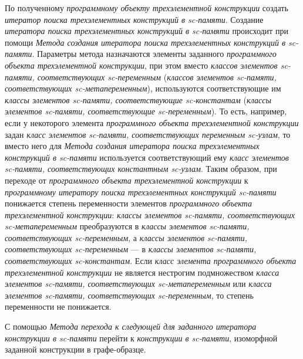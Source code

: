 \begin{SCn}
\begin{scnsubstruct}
\begin{scnsubstruct}
\begin{scnsubstruct}
\begin{scnsubstruct}
\begin{scnsubstruct}
\begin{scnsubstruct}
\begin{scnsubstruct}
\begin{scnsubstruct}
{\begin{scnitemize}
				\item По полученному \textit{программному объекту трехэлементной конструкции} создать \textit{итератор поиска трехэлементных конструкций в sc-памяти}. Создание \textit{итератора поиска трехэлементных конструкций в sc-памяти} происходит при помощи \textit{Метода создания итератора поиска трехэлементных конструкций в sc-памяти}. Параметры метода назначаются элементы заданного \textit{программного объекта трехэлементной конструкции}, при этом вместо \textit{классов элементов sc-памяти, соответствующих sc-переменным} (\textit{классов элементов sc-памяти, соответствующих sc-метапеременным}), используются соответствующие им \textit{классы элементов sc-памяти, соответствующие sc-константам} (\textit{классы элементов sc-памяти, соответствующие sc-переменным}). То есть, например, если у некоторого элемента \textit{программного объекта трехэлементной конструкции} задан \textit{класс элементов sc-памяти, соответствующих переменным sc-узлам}, то вместо него для \textit{Метода создания итератора поиска трехэлементных конструкций в sc-памяти} используется соответствующий ему \textit{класс элементов sc-памяти, соответствующих константным sc-узлам}. Таким образом, при переходе от \textit{программного объекта трехэлементной конструкции} к \textit{программному итератору поиска трехэлементных конструкций sc-памяти} понижается степень переменности элементов \textit{программного объекта трехэлементной конструкции}: \textit{классы элементов sc-памяти, соответствующих sc-метапеременным} преобразуются в \textit{классы элементов sc-памяти, соответствующих sc-переменным}, а \textit{классы элементов sc-памяти, соответствующих sc-переменным} --- в \textit{классы элементов sc-памяти, соответствующих sc-константам}. Если \textit{класс элемента программного объекта трехэлементной конструкции} не является нестрогим подмножеством \textit{класса элементов sc-памяти, соответствующих sc-метапеременным} или \textit{класса элементов sc-памяти, соответствующих sc-переменным}, то степень переменности не понижается.
				\item С помощью \textit{Метода перехода к следующей  для заданного итератора конструкции в sc-памяти} перейти к \textit{конструкции в sc-памяти}, изоморфной заданной конструкции в графе-образце.
			\end{scnitemize}
			
}
\end{scnsubstruct}
\end{scnsubstruct}
\end{scnsubstruct}
\end{scnsubstruct}
\end{scnsubstruct}
\end{scnsubstruct}
\end{scnsubstruct}
\end{scnsubstruct}
\end{SCn}
